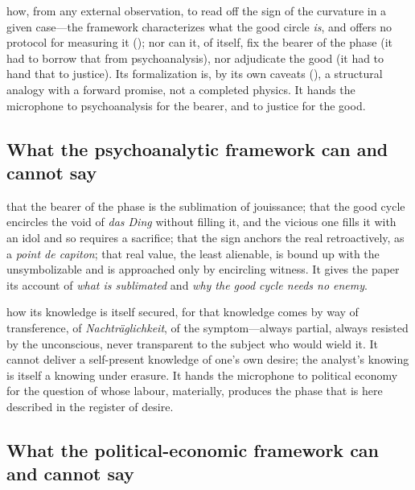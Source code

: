  how, from any external observation, to read off the sign of the curvature in a given case---the framework characterizes what the good circle \emph{is}, and offers no protocol for measuring it (); nor can it, of itself, fix the bearer of the phase (it had to borrow that from psychoanalysis), nor adjudicate the good (it had to hand that to justice). Its formalization is, by its own caveats (), a structural analogy with a forward promise, not a completed physics.  It hands the microphone to psychoanalysis for the bearer, and to justice for the good.

\subsection{What the psychoanalytic framework can and cannot say}
\label{p09:sec:concl-psych}

 that the bearer of the phase is the sublimation of jouissance; that the good cycle encircles the void of \emph{das Ding} without filling it, and the vicious one fills it with an idol and so requires a sacrifice; that the sign anchors the real retroactively, as a \emph{point de capiton}; that real value, the least alienable, is bound up with the unsymbolizable and is approached only by encircling witness. It gives the paper its account of \emph{what is sublimated} and \emph{why the good cycle needs no enemy}.

 how its knowledge is itself secured, for that knowledge comes by way of transference, of \emph{Nachträglichkeit}, of the symptom---always partial, always resisted by the unconscious, never transparent to the subject who would wield it. It cannot deliver a self-present knowledge of one's own desire; the analyst's knowing is itself a knowing under erasure.  It hands the microphone to political economy for the question of whose labour, materially, produces the phase that is here described in the register of desire.

\subsection{What the political-economic framework can and cannot say}
\label{p09:sec:concl-poleco}


